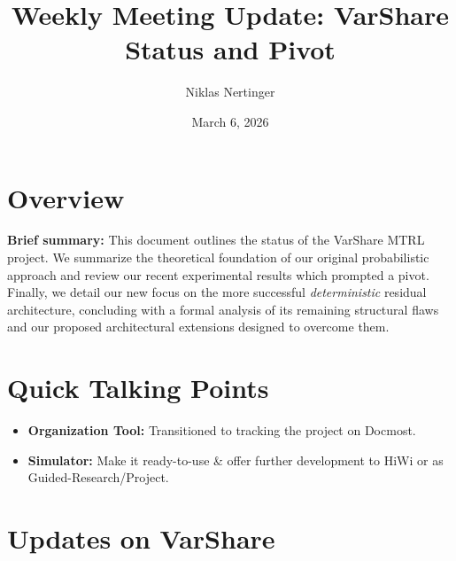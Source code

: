 \documentclass[11pt,a4paper]{article}
\title{Weekly Meeting Update: VarShare Status and Pivot}
\author{Niklas Nertinger}
\date{March 6, 2026}
\begin{document}
\maketitle

\section*{Overview}
\textbf{Brief summary:} This document outlines the status of the VarShare MTRL project. We summarize the theoretical foundation of our original probabilistic approach and review our recent experimental results which prompted a pivot. Finally, we detail our new focus on the more successful \textit{deterministic} residual architecture, concluding with a formal analysis of its remaining structural flaws and our proposed architectural extensions designed to overcome them.



\section*{Quick Talking Points}
\begin{itemize}
    \item \textbf{Organization Tool:} Transitioned to tracking the project on Docmost.
    \item \textbf{Simulator:} Make it ready-to-use \& offer further development to HiWi or as Guided-Research/Project.
\end{itemize}

\section*{Updates on VarShare}
\end{document}
